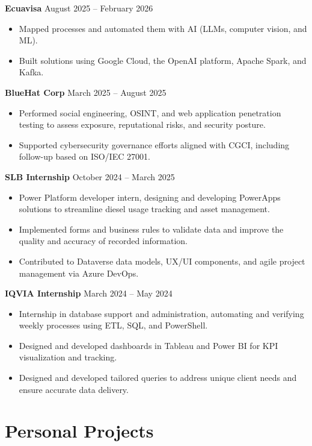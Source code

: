 \documentclass[11pt,a4paper]{article}
\newenvironment{uniformindent}{%
  \begin{list}{}{%
    \setlength{\leftmargin}{2em}
    \setlength{\rightmargin}{0pt}
    \setlength{\topsep}{0pt}
    \setlength{\partopsep}{0pt}
    \setlength{\parsep}{0pt}
    \setlength{\itemsep}{0pt}
  }
  \item[]
}{%
  \end{list}
}
\begin{document}
\begin{uniformindent}
\textbf{Ecuavisa} \hfill August 2025 -- February 2026
\begin{itemize}
    \item Mapped processes and automated them with AI (LLMs, computer vision, and ML).
    \item Built solutions using Google Cloud, the OpenAI platform, Apache Spark, and Kafka.
\end{itemize}

\textbf{BlueHat Corp} \hfill March 2025 -- August 2025
\begin{itemize}
    \item Performed social engineering, OSINT, and web application penetration testing to assess exposure, reputational risks, and security posture.
    \item Supported cybersecurity governance efforts aligned with CGCI, including follow-up based on ISO/IEC 27001.
\end{itemize}

\textbf{SLB Internship} \hfill October 2024 -- March 2025
\begin{itemize}
    \item Power Platform developer intern, designing and developing PowerApps solutions to streamline diesel usage tracking and asset management.
    \item Implemented forms and business rules to validate data and improve the quality and accuracy of recorded information.
    \item Contributed to Dataverse data models, UX/UI components, and agile project management via Azure DevOps.
\end{itemize}

\textbf{IQVIA Internship} \hfill March 2024 -- May 2024
\begin{itemize}
    \item Internship in database support and administration, automating and verifying weekly processes using ETL, SQL, and PowerShell.
    \item Designed and developed dashboards in Tableau and Power BI for KPI visualization and tracking.
    \item Designed and developed tailored queries to address unique client needs and ensure accurate data delivery.
\end{itemize}

\section*{Personal Projects}


\end{uniformindent}
\end{document}
